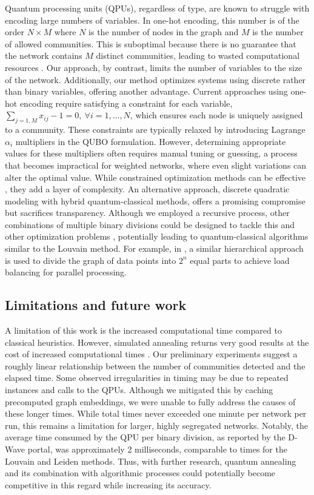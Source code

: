 \documentclass[pdflatex,sn-mathphys-num]{sn-jnl}%
\begin{document}
Quantum processing units (QPUs), regardless of type, are known to struggle with encoding large numbers of variables. In one-hot encoding, this number is of the order $N\times M$ where $N$ is the number of nodes in the graph and $M$ is the number of allowed communities. This is suboptimal because there is no guarantee that the network contains $M$ distinct communities, leading to wasted computational resources \cite{Negre2020}. Our approach, by contrast, limits the number of variables to the size of the network. Additionally, our method optimizes systems using discrete rather than binary variables, offering another advantage. Current approaches using one-hot encoding require satisfying a constraint for each variable, $\sum_{j=1,M}x_{ij}-1=0, \ \forall i=1, \ldots, N$, which ensures each node is uniquely assigned to a community. These constraints are typically relaxed by introducing Lagrange $\alpha_i$ multipliers in the QUBO formulation. However, determining appropriate values for these multipliers often requires manual tuning or guessing, a process that becomes impractical for weighted networks, where even slight variations can alter the optimal value. While constrained optimization methods can be effective \cite{Ushijima-Mwesigwa2017,Negre2020}, they add a layer of complexity. An alternative approach, discrete quadratic modeling with hybrid quantum-classical methods, offers a promising compromise \cite{Wierzbinski2023} but sacrifices transparency. Although we employed a recursive process, other combinations of multiple binary divisions could be designed to tackle this and other optimization problems \cite{Nembrini2022}, potentially leading to quantum-classical algorithms similar to the Louvain method. For example, in \cite{rathore2024loadbalancinghighperformance}, a similar hierarchical approach is used to divide the graph of data points into $2^n$ equal parts to achieve load balancing for parallel processing.

\subsection*{Limitations and future work}
A limitation of this work is the increased computational time compared to classical heuristics. However, simulated annealing returns very good results at the cost of increased computational times \cite{Guimera2004}. Our preliminary experiments suggest a roughly linear relationship between the number of communities detected and the elapsed time. Some observed irregularities in timing may be due to repeated instances and calls to the QPUs. Although we mitigated this by caching precomputed graph embeddings, we were unable to fully address the causes of these longer times. While total times never exceeded one minute per network per run, this remains a limitation for larger, highly segregated networks. Notably, the average time consumed by the QPU per binary division, as reported by the D-Wave portal, was approximately 2 milliseconds, comparable to times for the Louvain and Leiden methods. Thus, with further research, quantum annealing and its combination with algorithmic processes could potentially become competitive in this regard while increasing its accuracy.
\end{document}
